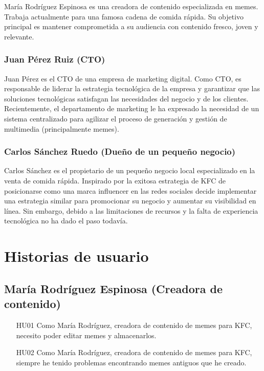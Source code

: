     María Rodríguez Espinosa es una creadora de contenido especializada en memes. Trabaja actualmente para una famosa cadena de comida rápida. Su objetivo principal es mantener comprometida a su audiencia con contenido fresco, joven y relevante.

    \subsubsection{Juan Pérez Ruiz (CTO)}

    Juan Pérez es el CTO de una empresa de marketing digital. Como CTO, es responsable de liderar la estrategia tecnológica de la empresa y garantizar que las soluciones tecnológicas satisfagan las necesidades del negocio y de los clientes. Recientemente, el departamento de marketing le ha expresado la necesidad de un sistema centralizado para agilizar el proceso de generación y gestión de multimedia (principalmente memes).

    \subsubsection{Carlos Sánchez Ruedo (Dueño de un pequeño negocio)}

    Carlos Sánchez es el propietario de un pequeño negocio local especializado en la venta de comida rápida. Inspirado por la exitosa estrategia de KFC de posicionarse como una marca influencer en las redes sociales decide implementar una estrategia similar para promocionar su negocio y aumentar su visibilidad en línea. Sin embargo, debido a las limitaciones de recursos y la falta de experiencia tecnológica no ha dado el paso todavía.

\section{Historias de usuario}

    \subsection{María Rodríguez Espinosa (Creadora de contenido)}

    \begin{enumerate}
        \item [HU01] Como María Rodríguez, creadora de contenido de memes para KFC, necesito poder editar memes y almacenarlos.
        \item [HU02] Como María Rodríguez, creadora de contenido de memes para KFC, siempre he tenido problemas encontrando memes antiguos que he creado.
    \end{enumerate}

